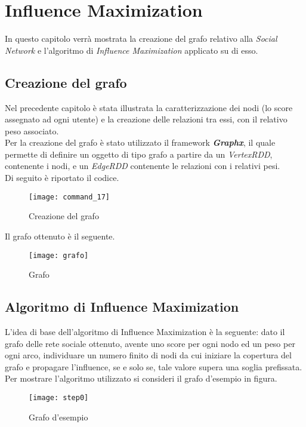 
\chapter{Influence Maximization}
In questo capitolo verrà mostrata la creazione del grafo relativo alla \textit{Social Network}
e l'algoritmo di \textit{Influence Maximization} applicato su di esso.

\section{Creazione del grafo}
Nel precedente capitolo è stata illustrata la caratterizzazione dei nodi (lo score
assegnato ad ogni utente) e la creazione delle relazioni tra essi, con il relativo
peso associato.\\
Per la creazione del grafo è stato utilizzato il framework \textit{\textbf{Graphx}},
il quale permette di definire un oggetto di tipo grafo a partire da un \textit{VertexRDD},
contenente i nodi, e un \textit{EdgeRDD} contenente le relazioni con i relativi pesi.\\
Di seguito è riportato il codice.

\begin{figure}[!htbp]
	\texttt{[image: command\_17]}
	\caption{Creazione del grafo}
	\label{command_17}
\end{figure}
\clearpage

Il grafo ottenuto è il seguente.
\begin{figure}[!htbp]
	\texttt{[image: grafo]}
	\caption{Grafo}
	\label{grafo}
\end{figure}
\clearpage
\section{Algoritmo di Influence Maximization}
L'idea di base dell'algoritmo di Influence Maximization è la seguente: dato il
grafo delle rete sociale ottenuto, avente uno score per ogni nodo ed un peso per
ogni arco, individuare un numero finito di nodi da cui iniziare la copertura del
grafo e propagare l'influence, se e solo se, tale valore supera una soglia prefissata.\\
Per mostrare l'algoritmo utilizzato si consideri il grafo d'esempio in figura.

\begin{figure}[!htbp]
  \begin{center}
    \texttt{[image: step0]}
  	\caption{Grafo d'esempio}
  	\label{step0}
  \end{center}
\end{figure}

